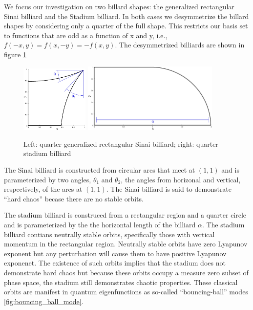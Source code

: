 \documentclass{report}
\begin{document}
We focus our investigation on two billard shapes: the generalized rectangular Sinai billiard and the Stadium billiard. In both cases we desymmetrize the billard shapes by considering only a quarter of the full shape. This restricts our basis set to functions that are odd as a function of x and y, i.e., $f(-x,y) = f(x,-y) = -f(x,y)$. The desymmetrized billiards are shown in figure \ref{fig:billiards}

\begin{figure}
  \begin{center}
    \includegraphics[width=0.3\textwidth]{figs/domains/qugrs_fig.eps}
    \includegraphics[width=0.6\textwidth]{figs/domains/qust_fig.eps}
    \caption{Left: quarter generalized rectangular Sinai billiard; right: quarter stadium billiard}
    \label{fig:billiards}
  \end{center}
\end{figure}

The Sinai billiard is constructed from circular arcs that meet at $(1,1)$ and is parameterized by two angles, $\theta_{1}$ and $\theta_{2}$, the angles from horizonal and vertical, respectively, of the arcs at $(1,1)$. The Sinai billiard is said to demonstrate ``hard chaos'' becase there are no stable orbits.

The stadium billiard is construced from a rectangular region and a quarter circle and is parameterized by the the horizontal length of the billiard $\alpha$. The stadium billiard contians neutrally stable orbits, specifically those with vertical momentum in the rectangular region. Neutrally stable orbits have zero Lyapunov exponent but any perturbation will cause them to have positive Lyapunov exponenet. The existence of such orbits implies that the stadium does not demonstrate hard chaos but because these orbits occupy a measure zero subset of phase space, the stadium still demonstrates chaotic properties. These classical orbits are manifest in quantum eigenfunctions as so-called ``bouncing-ball'' modes \ref{fig:bouncing_ball_mode}.
\end{document}

